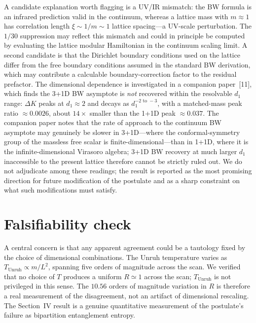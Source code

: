 \documentclass[11pt]{article}
\newcommand{\Tu}{T_{\mathrm{Unruh}}}
\begin{document}
A candidate explanation worth flagging is a UV/IR mismatch: the BW formula is an infrared prediction
valid in the continuum, whereas a lattice mass with $m\approx 1$ has correlation length
$\xi\sim 1/m\sim 1$ lattice spacing---a UV-scale perturbation. The $1/30$ suppression may reflect this
mismatch and could in principle be computed by evaluating the lattice modular Hamiltonian in the
continuum scaling limit. A second candidate is that the Dirichlet boundary conditions used on the lattice differ from the free boundary conditions assumed in the standard BW derivation, which may contribute a calculable boundary-correction factor to the residual prefactor. The dimensional dependence is investigated in a companion paper~[11], which
finds the 3+1D BW asymptote is \emph{not} recovered within the resolvable $d_{1}$ range: $\Delta K$
peaks at $d_{1}\approx 2$ and decays as $d_{1}^{-2\text{ to }-3}$, with a matched-mass peak ratio
$\approx 0.0026$, about $14\times$ smaller than the 1+1D peak $\approx 0.037$. The companion paper notes that the rate of approach to the continuum BW asymptote may genuinely be slower in 3+1D---where the conformal-symmetry group of the massless free scalar is finite-dimensional---than in 1+1D, where it is the infinite-dimensional Virasoro algebra; 3+1D BW recovery at much larger $d_{1}$ inaccessible to the present lattice therefore cannot be strictly ruled out. We do not adjudicate
among these readings; the result is reported as the most promising direction for future modification of
the postulate and as a sharp constraint on what such modifications must satisfy.

\section{Falsifiability check}
A central concern is that any apparent agreement could be a tautology fixed by the choice of
dimensional combinations. The Unruh temperature varies as $\Tu \propto m/L^{2}$, spanning five orders
of magnitude across the scan. We verified that no choice of $T$ produces a uniform $R\simeq 1$ across
the scan; $\Tu$ is not privileged in this sense. The $10.56$ orders of magnitude variation in $R$ is
therefore a real measurement of the disagreement, not an artifact of dimensional rescaling. The Section~IV
result is a genuine quantitative measurement of the postulate's failure as bipartition entanglement
entropy.
\end{document}
